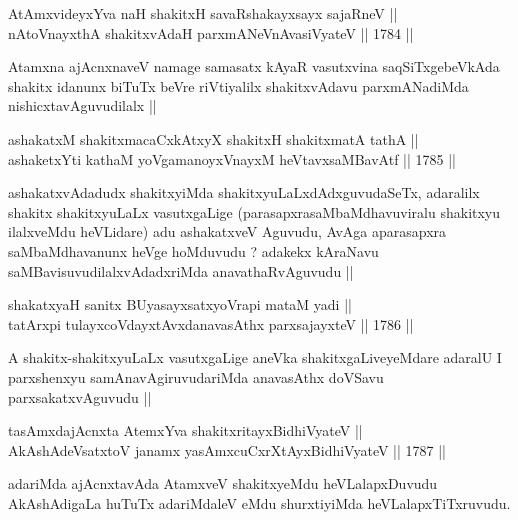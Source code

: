 \begin{shl}
AtAmxvideyxYva naH shakitxH savaRshakayxsayx sajaRneV || \\
nAtoV\s nayxthA shakitxvAdaH parxmANeVnAvasiVyateV ||  1784 ||  
\end{shl}

\begin{artha}
Atamxna ajAcnxnaveV namage samasatx kAyaR vasutxvina saqSiTxgebeVkAda
shakitx idanunx biTuTx beVre riVtiyalilx shakitxvAdavu parxmANadiMda
nishicxtavAguvudilalx ||
\end{artha}


\begin{shl}
ashakatxM shakitxmacaCxkAtxyX shakitxH shakitxmatA tathA || \\
ashaketxYti kathaM yoVgamanoyxVnayxM heVtavxsaMBavAtf ||  1785 ||  
\end{shl}

\begin{artha}
ashakatxvAdadudx shakitxyiMda shakitxyuLaLxdAdxguvudaSeTx, adaralilx
shakitx shakitxyuLaLx vasutxgaLige (parasapxrasaMbaMdhavuviralu
shakitxyu ilalxveMdu heVLidare) adu ashakatxveV Aguvudu, AvAga
aparasapxra saMbaMdhavanunx heVge hoMduvudu ? adakekx kAraNavu
saMBavisuvudilalxvAdadxriMda anavathaRvAguvudu ||
\end{artha}


\begin{shl}
shakatxyaH sanitx BUyasayxsatxyoVrapi mataM yadi || \\
tatArxpi tulayxcoVdayxtAvxdanavasAthx parxsajayxteV ||  1786 || 
\end{shl}

\begin{artha}
A shakitx-shakitxyuLaLx vasutxgaLige aneVka shakitxgaLiveyeMdare
adaralU I parxshenxyu samAnavAgiruvudariMda anavasAthx doVSavu
parxsakatxvAguvudu ||
\end{artha}


\begin{shl}
tasAmxdajAcnxta AtemxYva shakitxritayxBidhiVyateV || \\
AkAshAdeVsatxtoV janamx yasAmxcuCxrXtAyx\s BidhiVyateV ||  1787 ||  
\end{shl}

\begin{artha}
adariMda ajAcnxtavAda AtamxveV shakitxyeMdu heVLalapxDuvudu
AkAshAdigaLa huTuTx adariMdaleV eMdu shurxtiyiMda heVLalapxTiTxruvudu.
\end{artha}

